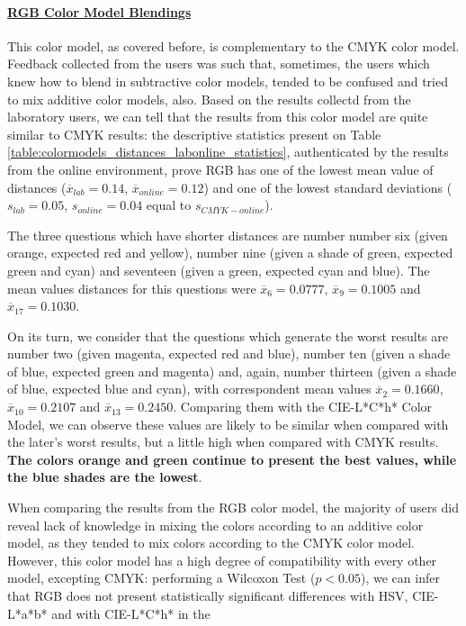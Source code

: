 \paragraph{\ul{RGB Color Model Blendings}}
\label{subsubsec:rgbcolormodel}
%
This color model, as covered before, is complementary to the CMYK color model. Feedback collected from the users was such that, sometimes, the users which knew how to blend in subtractive color models,
tended to be confused and tried to mix additive color models, also. Based on the results collectd from the laboratory users, we can tell that the results from this color model are quite similar to CMYK results: the descriptive statistics present
on Table \ref{table:colormodels_distances_labonline_statistics}, authenticated by the results from the online environment, prove RGB has one of the lowest mean value of distances ($\overline{x}_{lab} = 0.14$, $\overline{x}_{online} = 0.12$) and one of
the lowest standard deviations ($s_{lab} = 0.05$, $s_{online} = 0.04$ equal to $s_{CMYK-online}$). \par
%
The three questions which have shorter distances are number number six (given orange, expected red and yellow), number nine (given a shade of green, expected green and cyan) and seventeen (given a green, expected cyan and blue). The mean values
distances for this questions were $\overline{x}_{6} = 0.0777$, $\overline{x}_{9} = 0.1005$ and $\overline{x}_{17} = 0.1030$. \par
%
On its turn, we consider that the questions which generate the worst results are number two (given magenta, expected red and blue), number ten (given a shade of blue, expected green and magenta) and, again, number thirteen (given a shade of blue,
expected blue and cyan), with correspondent mean values $\overline{x}_{2} = 0.1660$, $\overline{x}_{10} = 0.2107$ and $\overline{x}_{13} = 0.2450$.
Comparing them with the CIE-L*C*h* Color Model, we can observe these values are likely to be similar when compared with the later's worst results, but a little high when compared with CMYK results. \textbf{The colors orange and green continue to
present the best values, while the blue shades are the lowest}. \par
%
When comparing the results from the RGB color model, the majority of users did reveal lack of knowledge in mixing the colors according to an additive color model, as they tended to mix colors according to the CMYK color model. However, this color
model has a high degree of compatibility with every other model, excepting CMYK: performing a Wilcoxon Test ($p < 0.05$), we can infer that RGB does not present statistically significant differences with HSV, CIE-L*a*b* and with CIE-L*C*h* in the
